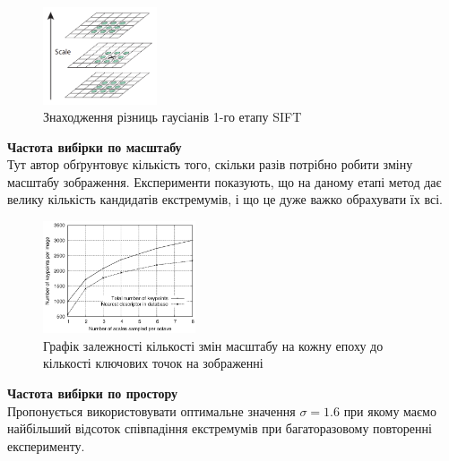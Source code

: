 \begin{enumerate}
          \begin{figure}[H]
              \centering
              \includegraphics[width=0.3\textwidth]{images/sift2}
              \caption{Знаходження різниць гаусіанів 1-го етапу SIFT}
              \label{fig:swift2}
          \end{figure}

          \subitem \textbf{Частота вибірки по масштабу} \\
          Тут автор обґрунтовує кількість того, скільки разів потрібно робити
          зміну масштабу зображення. Експерименти показують, що на даному етапі метод дає
          велику кількість кандидатів екстремумів, і що це дуже важко обрахувати їх всі.
          \begin{figure}[H]
              \centering
              \includegraphics[width=0.4\textwidth]{images/sift3}
              \caption{Графік залежності кількості змін масштабу на кожну епоху до
                  кількості ключових точок на зображенні}
              \label{fig:swift3}
          \end{figure}

          \subitem \textbf{Частота вибірки по простору} \\
          Пропонується використовувати оптимальне значення $\sigma = 1.6$ при якому
          маємо найбільший відсоток співпадіння екстремумів при багаторазовому повторенні
          експерименту.


\end{enumerate}
